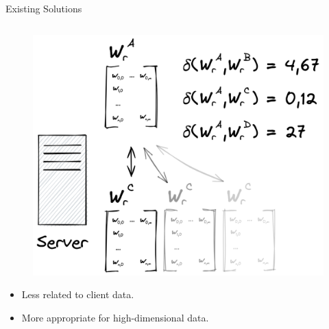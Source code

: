 \begin{frame}{Existing Solutions}
\begin{columns}[T]
{\begin{column}{.33\textwidth}
        \begin{figure}
          \centering
          \includegraphics[height=.36\textheight]{figures/radar/server-side-comp}
        \end{figure}

        \begin{itemize}\smaller
          \item Less related to client data.
          \item More appropriate for high-dimensional data.
        \end{itemize}
      \end{column}%
    }

\end{columns}
\end{frame}
